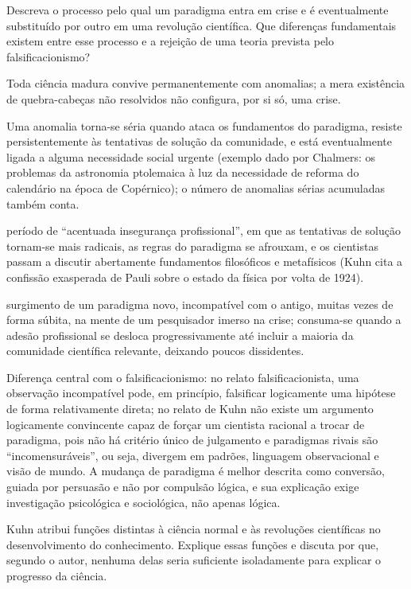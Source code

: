 \documentclass[10pt]{extarticle}
\newcommand{\resposta}[1]{\par\smallskip\noindent #1}
\begin{document}
\begin{questoes}
\item Descreva o processo pelo qual um paradigma entra em crise e é eventualmente substituído por outro em uma revolução científica. Que diferenças fundamentais existem entre esse processo e a rejeição de uma teoria prevista pelo falsificacionismo?

\resposta{
\begin{topicos}
\item Toda ciência madura convive permanentemente com anomalias; a mera existência de quebra-cabeças não resolvidos não configura, por si só, uma crise.
\item Uma anomalia torna-se séria quando ataca os fundamentos do paradigma, resiste persistentemente às tentativas de solução da comunidade, e está eventualmente ligada a alguma necessidade social urgente (exemplo dado por Chalmers: os problemas da astronomia ptolemaica à luz da necessidade de reforma do calendário na época de Copérnico); o número de anomalias sérias acumuladas também conta.
\item[Crise:] período de \enquote{acentuada insegurança profissional}, em que as tentativas de solução tornam-se mais radicais, as regras do paradigma se afrouxam, e os cientistas passam a discutir abertamente fundamentos filosóficos e metafísicos (Kuhn cita a confissão exasperada de Pauli sobre o estado da física por volta de 1924).
\item[Revolução:] surgimento de um paradigma novo, incompatível com o antigo, muitas vezes de forma súbita, na mente de um pesquisador imerso na crise; consuma-se quando a adesão profissional se desloca progressivamente até incluir a maioria da comunidade científica relevante, deixando poucos dissidentes.
\item Diferença central com o falsificacionismo: no relato falsificacionista, uma observação incompatível pode, em princípio, falsificar logicamente uma hipótese de forma relativamente direta; no relato de Kuhn não existe um argumento logicamente convincente capaz de forçar um cientista racional a trocar de paradigma, pois não há critério único de julgamento e paradigmas rivais são \enquote{incomensuráveis}, ou seja, divergem em padrões, linguagem observacional e visão de mundo. A mudança de paradigma é melhor descrita como conversão, guiada por persuasão e não por compulsão lógica, e sua explicação exige investigação psicológica e sociológica, não apenas lógica.
\end{topicos}
}

\item Kuhn atribui funções distintas à ciência normal e às revoluções científicas no desenvolvimento do conhecimento. Explique essas funções e discuta por que, segundo o autor, nenhuma delas seria suficiente isoladamente para explicar o progresso da ciência.


\end{questoes}
\end{document}
